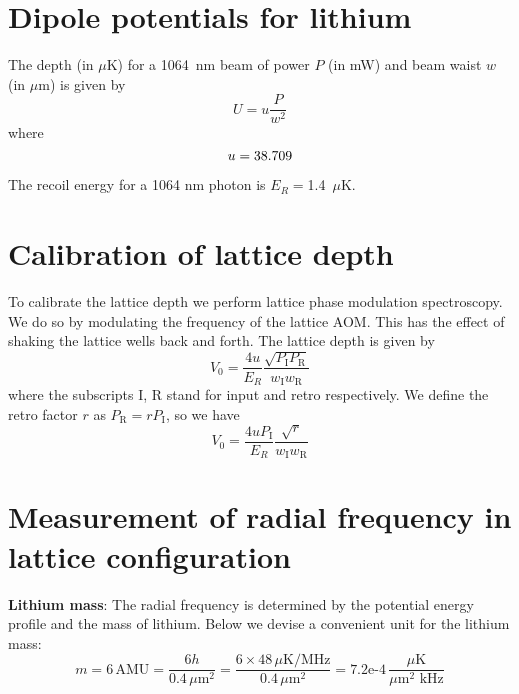 \documentclass[11pt,letter]{article}
\newcommand{\pin}{\ensuremath{ P_{\text{I}}} }
\newcommand{\pret}{\ensuremath{ P_{\text{R}}} }
\newcommand{\win}{\ensuremath{ w_{\text{I}}} }
\newcommand{\wret}{\ensuremath{ w_{\text{R}}} }
\begin{document}
\section{Dipole potentials for lithium } 

The depth (in $\mu$K) for a 1064~nm beam of power $P$ (in mW)  and beam waist
$w$ (in $\mu$m) is given by
\begin{equation}
  U  =  u \frac{ P }{w^{2}}  
\end{equation}
where 
\begin{equation}
   u  = 38.709   \\ 
\end{equation} 

The recoil energy for a 1064 nm photon is $E_{R}=$1.4~$\mu$K.

\section{Calibration of lattice depth}

To calibrate the lattice depth we perform lattice phase modulation
spectroscopy.  We do so by modulating the frequency of the lattice AOM.  This
has the effect of shaking the lattice wells back and forth.  The lattice depth
is given by 
\begin{equation}
 V_{0}  =  \frac{4u}{E_{R}}\frac{ \sqrt{ \pin \pret } }{ \win \wret}  
\end{equation}
where the subscripts I, R stand for input and retro respectively. We
define the retro factor $r$ as $\pret = r\pin$, so we have
\begin{equation}
 V_{0}  =  \frac{4u\pin}{E_{R}}\frac{ \sqrt{  r } }{ \win \wret}  
\end{equation}


\section{Measurement of radial frequency in lattice configuration} 

{\bf Lithium mass}:   The radial frequency is determined by the potential
energy profile and the mass of lithium.   Below we devise a convenient unit
for the lithium mass:
\begin{equation}
 m  = 6\,\text{AMU} =  \frac{6 h}{0.4\,\mu\text{m}^{2} } = 
 \frac{6\times48\,\mu\text{K} / \text{MHz}}{0.4\,\mu\text{m}^{2} }
  = 7.2\text{e-4} \, \frac{ \mu\text{K} }{ \mu\text{m}^{2}\,\, \text{kHz}}
\end{equation}
\end{document}
